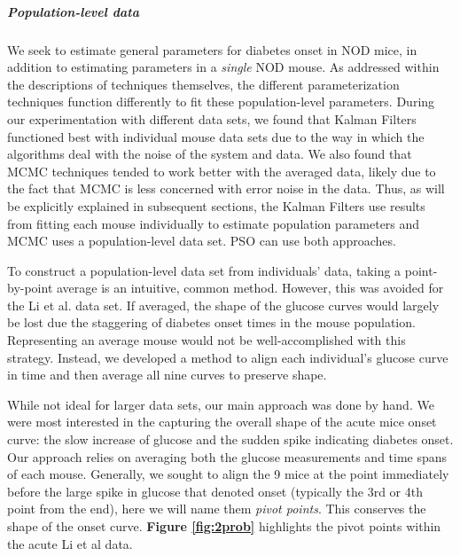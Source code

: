 \subparagraph{Population-level data} \label{section:T1D_population_data}
We seek to estimate general parameters for diabetes onset in NOD mice, in addition to estimating parameters in a \emph{single} NOD mouse. As addressed within the descriptions of techniques themselves, the different parameterization techniques function differently to fit these population-level parameters. During our experimentation with different data sets, we found that Kalman Filters functioned best with individual mouse data sets due to the way in which the algorithms deal with the noise of the system and data. We also found that MCMC techniques tended to work better with the averaged data, likely due to the fact that MCMC is less concerned with error noise in the data. Thus, as will be explicitly explained in subsequent sections, the Kalman Filters use results from fitting each mouse individually to estimate population parameters and MCMC uses a population-level data set. PSO can use both approaches.
\par To construct a population-level data set from individuals' data, taking a point-by-point average is an intuitive, common method. However, this was avoided for the Li et al. data set. If averaged, the shape of the glucose curves would largely be lost due the staggering of diabetes onset times in the mouse population. Representing an average mouse would not be well-accomplished with this strategy. Instead, we developed a method to align each individual's glucose curve in time and then average all nine curves to preserve shape. 
\par While not ideal for larger data sets, our main approach was done by hand. We were most interested in the capturing the overall shape of the acute mice onset curve: the slow increase of glucose and the sudden spike indicating diabetes onset. Our approach relies on averaging both the glucose measurements and time spans of each mouse. Generally, we sought to align the 9 mice at the point immediately before the large spike in glucose that denoted onset (typically the 3rd or 4th point from the end), here we will name them \emph{pivot points}. This conserves the shape of the onset curve. \textbf{Figure 
\ref{fig:2prob}} highlights the pivot points within the acute Li et al data.
